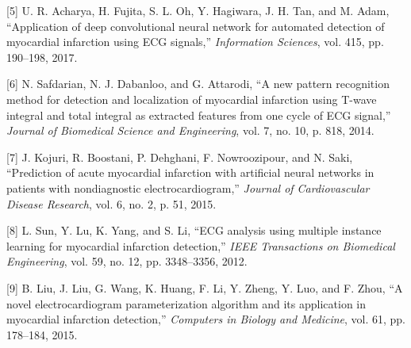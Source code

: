 \documentclass[conference]{IEEEtran}
\begin{document}
[5] U. R. Acharya, H. Fujita, S. L. Oh, Y. Hagiwara, J. H. Tan, and M. Adam, “Application of deep convolutional neural network for automated detection of myocardial infarction using ECG signals,” \textit{Information Sciences}, vol. 415, pp. 190--198, 2017.

[6] N. Safdarian, N. J. Dabanloo, and G. Attarodi, “A new pattern recognition method for detection and localization of myocardial infarction using T-wave integral and total integral as extracted features from one cycle of ECG signal,” \textit{Journal of Biomedical Science and Engineering}, vol. 7, no. 10, p. 818, 2014.

[7] J. Kojuri, R. Boostani, P. Dehghani, F. Nowroozipour, and N. Saki, “Prediction of acute myocardial infarction with artificial neural networks in patients with nondiagnostic electrocardiogram,” \textit{Journal of Cardiovascular Disease Research}, vol. 6, no. 2, p. 51, 2015.

[8] L. Sun, Y. Lu, K. Yang, and S. Li, “ECG analysis using multiple instance learning for myocardial infarction detection,” \textit{IEEE Transactions on Biomedical Engineering}, vol. 59, no. 12, pp. 3348--3356, 2012.

[9] B. Liu, J. Liu, G. Wang, K. Huang, F. Li, Y. Zheng, Y. Luo, and F. Zhou, “A novel electrocardiogram parameterization algorithm and its application in myocardial infarction detection,” \textit{Computers in Biology and Medicine}, vol. 61, pp. 178--184, 2015.
\end{document}

